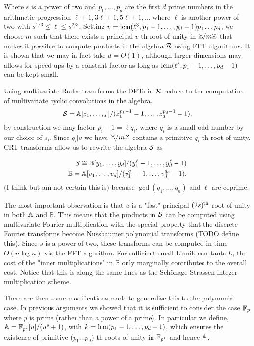 Where $s$ is a power of two and $p_1, \ldots, p_d$ are the first $d$ prime numbers in the arithmetic progression $\ell + 1, 3\ell + 1, 5\ell + 1, \ldots$ where $\ell$ is another power of two with $s^{1/3} \leq \ell \leq s^{2/3}$.  Setting $v = \textrm{lcm}(\ell^3, p_1 - 1, \ldots, p_d - 1)p_1\dots p_d$, we choose $m$ such that there exists a principal $v$-th root of unity in ${\mathbb Z}/m{\mathbb Z}$ that makes it possible to compute products in the algebra $\mathcal R$ using FFT algorithms. It is shown that we may in fact take $d = O(1)$, although larger dimensions may allows for speed ups by a constant factor as long as $\textrm{lcm}(\ell^3, p_1 - 1, \ldots, p_d - 1)$ can be kept small.

Using multivariate Rader transforms the DFTs in $\mathcal R$ reduce to the computation of multivariate cyclic convolutions in the algebra.
\[
    \mathcal S = {\mathbb A}[z_1, \ldots, _d] / (z_1^{p_1 - 1} - 1, \ldots, z_d^{p_d - 1} - 1).
\]
by construction we may factor $p_i - 1 = \ell q_i$, where $q_i$ is a small odd number by our choice of $s_i$. Since $q_i | v$ we have ${\mathbb Z} /mZ$ contains a primitive $q_i$-th root of unity. CRT transforms allow us to rewrite the algebra $\mathcal S$ as

\begin{align*}
    \mathcal S \cong \mathbb{B}[y_1, \ldots, y_d]/(y_1^\ell - 1, \ldots, y_d^\ell - 1)\\
    \mathbb{B} = \mathbb{A}[v_1, \ldots, v_d] / (v_1^{q_1} - 1, \ldots, v_d^{q_d} - 1).
\end{align*}
(I think but am not certain this is) because $\gcd(q_1, \ldots, q_n)$ and $\ell$ are coprime.

The most important observation is that $u$ is a "fast" principal $(2s)^{\textrm{th}}$ root of unity in both ${\mathbb A}$ and $\mathbb{B}$. This means that the products in $\mathcal S$ can be computed using multivariate Fourier multiplication with the special property that the discrete Fourier transforms become Nussbaumer polynomial transforms (TODO define this). Since $s$ is a power of two, these transforms can be computed in time $O(n \log n)$ via the FFT algorithm. For sufficient small Linnik constants $L$, the cost of the "inner multiplications" in $\mathbb{B}$ only marginally contributes to the overall cost. Notice that this is along the same lines as the Sch\"{o}nage Strassen integer multiplication scheme.

There are then some modifications made to generalise this to the polynomial case. In previous arguments we showed that it is sufficient to consider the case ${\mathbb F}_p$ where $p$ is prime (rather than a power of a prime). In particular we define, ${\mathbb A} = {\mathbb F}_{p^k}[u] / (u^s + 1)$, with $k = \textrm{lcm}(p_1 - 1, \ldots, p_d - 1)$, which ensures the existence of primitive ($p_1 \ldots p_d$)-th roots of unity in ${\mathbb F}_{p^k}$ and hence ${\mathbb A}$.

